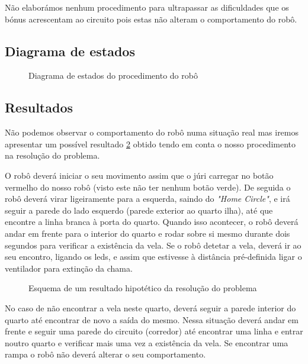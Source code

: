 \documentclass[pdftex,12pt,a4paper]{report}
\begin{document}
Não elaborámos nenhum procedimento para ultrapassar as dificuldades que os bónus acrescentam ao circuito pois estas não alteram o comportamento do robô.

\clearpage
\subsection{Diagrama de estados}

\begin{figure}[h]
\centerline{}
\caption{Diagrama de estados do procedimento do robô}\label{diagrama}
\end{figure}

\subsection{Resultados}

Não podemos observar o comportamento do robô numa situação real mas iremos apresentar um possível resultado \ref{resultado} obtido tendo em conta o nosso procedimento na resolução do problema.

O robô deverá iniciar o seu movimento assim que o júri carregar no botão vermelho do nosso robô (visto este não ter nenhum botão verde).
De seguida o robô deverá virar ligeiramente para a esquerda, saindo do \emph{"Home Circle"}, e irá seguir a parede do lado esquerdo (parede exterior ao quarto ilha), até que encontre a linha branca à porta do quarto. Quando isso acontecer, o robô deverá andar em frente para o interior do quarto e rodar sobre si mesmo durante dois segundos para verificar a existência da vela. Se o robô detetar a vela, deverá ir ao seu encontro, ligando os leds, e assim que estivesse à distância pré-definida ligar o ventilador para extinção da chama. 
\newpage


\begin{figure}[h]
\centerline{}
\caption{Esquema de um resultado hipotético da resolução do problema}\label{resultado}
\end{figure}


No caso de não encontrar a vela neste quarto, deverá seguir a parede interior do quarto até encontrar de novo a saída do mesmo. Nessa situação deverá andar em frente e seguir uma parede do circuito (corredor) até encontrar uma linha e entrar noutro quarto e verificar mais uma vez a existência da vela. Se encontrar uma rampa o robô não deverá alterar o seu comportamento.
\end{document}
